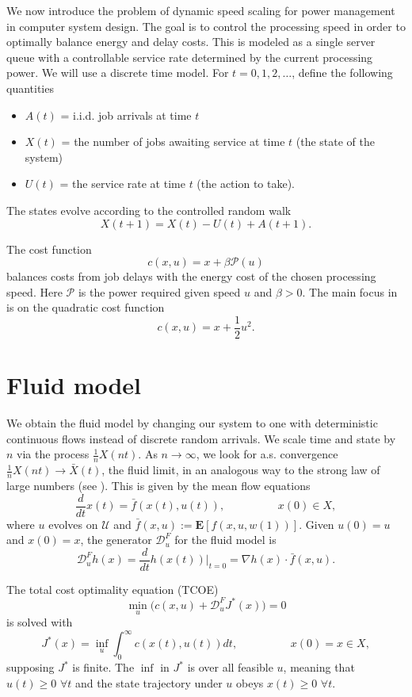 \documentclass[11pt]{article}
\begin{document}
We now introduce the problem of dynamic speed scaling for power management in computer system design. The goal is to control the processing speed in order to optimally balance energy and delay costs. This is modeled as a single server queue with a controllable service rate determined by the current processing power. We will use a discrete time model. For $t=0,1,2,\ldots$, define the following quantities
\begin{itemize}
\item $A(t)$ = i.i.d. job arrivals at time $t$
\item $X(t)$ = the number of jobs awaiting service at time $t$ (the state of the system)
\item $U(t)$ = the service rate at time $t$ (the action to take).
\end{itemize}

The states evolve according to the controlled random walk
$$X(t+1) = X(t) - U(t) + A(t+1).$$

The cost function 
$$c(x,u) = x + \beta \mathcal{P}(u)$$
balances costs from job delays with the energy cost of the chosen processing speed. Here $\mathcal{P}$ is the power required given speed $u$ and $\beta > 0$. The main focus in \cite{paper} is on the quadratic cost function
$$c(x,u) = x + \frac{1}{2} u^2.$$



\section{Fluid model}\label{sec:fluid}

We obtain the fluid model by changing our system to one with deterministic continuous flows instead of discrete random arrivals. We scale time and state by $n$ via the process $\frac{1}{n} X(nt)$. As $n\rightarrow \infty$, we look for a.s. convergence $\frac{1}{n}X(nt) \rightarrow \bar X(t)$, the fluid limit, in an analogous way to the strong law of large numbers (see \cite{lecture}). This is given by the mean flow equations
$$\frac{d}{dt} x(t) = \bar f(x(t),u(t)), \hspace{2cm} x(0) \in X,$$
where $u$ evolves on $\mathcal{U}$ and $\bar f(x,u) := \mathbf{E}[f(x,u,w(1))]$.
Given $u(0)=u$ and $x(0)=x$, the generator $\mathcal{D}_u^F$ for the fluid model is
$$\mathcal{D}_u^F h(x) = \frac{d}{dt} h(x(t)) \vert_{t=0} = \nabla h(x) \cdot \bar f(x,u).$$

The total cost optimality equation (TCOE)
$$\min_u \Big(c(x,u) + \mathcal{D}_u^F J^*(x)\Big) = 0$$
is solved with
$$J^*(x) = \inf_u \int_0^\infty c(x(t),u(t)) dt, \hspace{2cm} x(0)=x \in X,$$
supposing $J^*$ is finite. The $\inf$ in $J^*$ is over all feasible $u$, meaning that $u(t)\geq 0$ $\forall t$ and the state trajectory under $u$ obeys $x(t) \geq 0$ $\forall t$.
\end{document}
